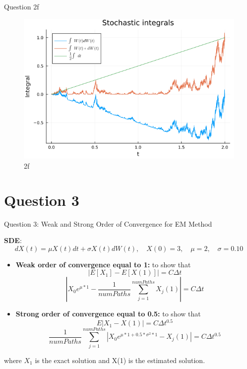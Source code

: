 \documentclass[compress,12pt]{beamer}
\begin{document}
\begin{frame}{Question 2f}
      \begin{figure}[H]
            \centering
            \includegraphics[scale=0.5]{imgs/2f.png}
            \caption{2f}
            \label{fig:2f}
      \end{figure}

\end{frame}

\section{Question 3}
\begin{frame}{Question 3: Weak and Strong Order of Convergence for EM Method}

    \textbf{SDE}:
    \[
    dX(t) = \mu X(t) dt + \sigma X(t) dW(t), \quad X(0)=3, \quad \mu=2 , \quad \sigma=0.10
    \]

    \begin{itemize}
        \item \textbf{Weak order of convergence equal to 1:} to show that 
         \[
    |E[X_1]-E[X(1)]|=C\Delta t 
    \]
    \[
    |X_0e^{\mu*1}-\frac{1}{numPaths}\sum_{j=1}^{numPaths}X_j(1)|=C\Delta t 
    \]
        \item \textbf{Strong order of convergence equal to 0.5:} to show that
         \[
    E|X_1-X(1)|=C\Delta t^{0.5} 
    \]
    \[
    \frac{1}{numPaths}\sum_{j=1}^{numPaths}|X_0e^{\mu*1+0.5*\sigma^2*1}-X_j(1)|=C\Delta t^{0.5} 
    \]
    \end{itemize}
    where ${X_1}$ is the exact solution and X(1) is the estimated solution.
\end{frame}
\end{document}
